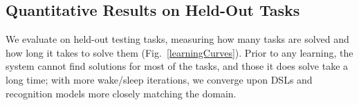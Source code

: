 \documentclass{article}
\newcommand{\systemEnding}{\textsc{DreamCoder}}
\begin{document}
\subsection{Quantitative Results on Held-Out Tasks}\label{quantitative}
We evaluate  on held-out testing tasks,
measuring how many
tasks are solved and how long it takes to solve them (Fig.~\ref{learningCurves}).
Prior to any learning,
the system cannot find solutions for most of the tasks,
and those it does solve take a long time;
with more wake/sleep iterations,
we converge upon DSLs and recognition models 
more closely matching the domain.


\end{document}
